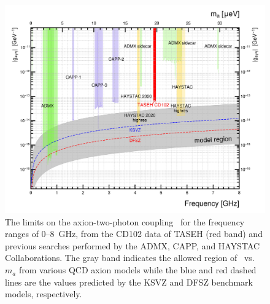 \begin{figure} [htbp]
  \centering
 \includegraphics[width=12.9cm]{figures/RealData_limit_allexp.png}
  \caption{The limits on the axion-two-photon coupling \gagg\ for the 
frequency ranges of 0--8~GHz, from the CD102 data of TASEH (red band) and 
previous 
searches performed by the ADMX, CAPP, and HAYSTAC Collaborations. The gray 
band indicates the allowed region of \gagg\ vs. $m_a$ from various QCD axion 
models while the blue and red dashed lines are the values predicted by the 
KSVZ and DFSZ benchmark models, respectively.}
  \label{fig:gaggall}
\end{figure}


